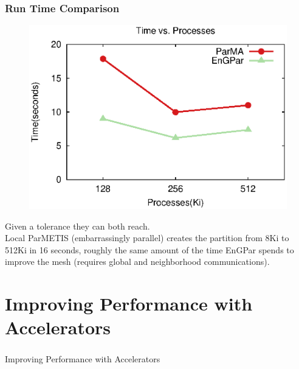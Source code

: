 \documentclass{beamer}
\begin{document}
\begin{frame}
  \frametitle{Run Time Comparison}
  \begin{figure}
    \centering
    \includegraphics[width=.6\textwidth]{figures/time_v_cores.eps}
  \end{figure}
  Given a tolerance they can both reach.\\

  Local ParMETIS (embarrassingly parallel) creates the partition from 8Ki to 512Ki in 16
  seconds, roughly the same amount of the time EnGPar spends to improve the mesh
  (requires global and neighborhood communications).
\end{frame}

\section{Improving Performance with Accelerators}
\begin{frame}
  \frametitle{}
  \center \huge{Improving Performance with Accelerators}
\end{frame}
\end{document}
